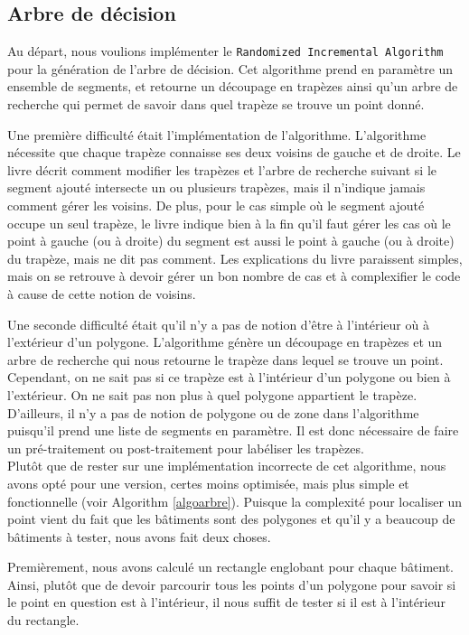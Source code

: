 \subsection{Arbre de décision}

Au départ, nous voulions implémenter le \texttt{Randomized Incremental Algorithm} pour la génération de l'arbre de décision. Cet algorithme prend en paramètre un ensemble de segments, et retourne un découpage en trapèzes ainsi qu'un arbre de recherche qui permet de savoir dans quel trapèze se trouve un point donné.

Une première difficulté était l'implémentation de l'algorithme. L'algorithme nécessite que chaque trapèze connaisse ses deux voisins de gauche et de droite. Le livre décrit comment modifier les trapèzes et l'arbre de recherche suivant si le segment ajouté intersecte un ou plusieurs trapèzes, mais il n'indique jamais comment gérer les voisins. De plus, pour le cas simple où le segment ajouté occupe un seul trapèze, le livre indique bien à la fin qu'il faut gérer les cas où le point à gauche (ou à droite) du segment est aussi le point à gauche (ou à droite) du trapèze, mais ne dit pas comment. Les explications du livre paraissent simples, mais on se retrouve à devoir gérer un bon nombre de cas et à complexifier le code à cause de cette notion de voisins.

Une seconde difficulté était qu'il n'y a pas de notion d'être à l'intérieur où à l'extérieur d'un polygone. L'algorithme génère un découpage en trapèzes et un arbre de recherche qui nous retourne le trapèze dans lequel se trouve un point. Cependant, on ne sait pas si ce trapèze est à l'intérieur d'un polygone ou bien à l'extérieur. On ne sait pas non plus à quel polygone appartient le trapèze. D'ailleurs, il n'y a pas de notion de polygone ou de zone dans l'algorithme puisqu'il prend une liste de segments en paramètre. Il est donc nécessaire de faire un pré-traitement ou post-traitement pour labéliser les trapèzes.\\

Plutôt que de rester sur une implémentation incorrecte de cet algorithme, nous avons opté pour une version, certes moins optimisée, mais plus simple et fonctionnelle (voir Algorithm \ref{algoarbre}). Puisque la complexité pour localiser un point vient du fait que les bâtiments sont des polygones et qu'il y a beaucoup de bâtiments à tester, nous avons fait deux choses.

Premièrement, nous avons calculé un rectangle englobant pour chaque bâtiment. Ainsi, plutôt que de devoir parcourir tous les points d'un polygone pour savoir si le point en question est à l'intérieur, il nous suffit de tester si il est à l'intérieur du rectangle.

